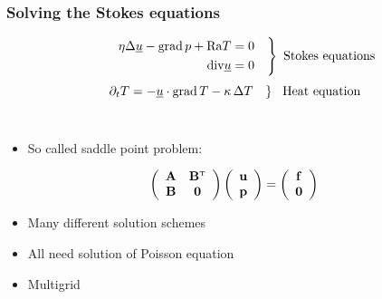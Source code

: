 \documentclass[t,compress=false,usepdftitle=false]{beamer}
\renewcommand{\vec}[1]{\underline{#1}}
\newcommand{\dt}{\partial_t}
\renewcommand{\div}{\mbox{div}}
\begin{document}
\begin{frame}\frametitle{Solving the Stokes equations}
\vspace*{-3mm}
\begin{myColorBox}{.8}{}\color{linkcolor}
\vspace*{-5mm}
\centering
\begin{equation*}
\left.
\begin{align}
 \quad\quad{\eta \Delta \vec{u}} - \grad p + \mbox{Ra} T &= 0 \quad \\
 \div \vec{u} &= 0 \\
\end{align}
\right\} \,\, \mbox{Stokes equations}  \,
\end{equation*}
\begin{equation*}
\left. \dt T = - \vec{u} \cdot \grad{T} - \kappa\, \Delta T \quad\right \} \,\,\,\,\mbox{Heat equation}
\end{equation*}\\
\end{myColorBox}
\vspace*{-2mm}
\begin{itemize}
 \item So called saddle point problem:
\end{itemize}
\vspace*{-2mm}
\begin{myColorBox}{.8}{}\color{linkcolor}
\vspace*{-5mm}
\centering
\begin{equation*}
\left( \begin{array}{cc}
\mathbf{A} & \mathbf{B}^{\mbox{\tiny{T}}} \\
\mathbf{B} & \mathbf{0} \\
\end{array}\right)
\left( \begin{array}{c}
\mathbf{u} \\
\mathbf{p} \\
\end{array}\right) =
\left( \begin{array}{c}
\mathbf{f} \\
\mathbf{0} \\
\end{array}\right)
\end{equation*}
\end{myColorBox}
\vspace*{-2mm}
\begin{itemize}
 \item Many different solution schemes
 \item All need solution of Poisson equation
 \item Multigrid
\end{itemize}
\end{frame}
\end{document}
